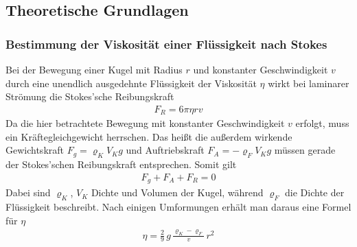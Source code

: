 \documentclass[12pt,a4paper,german]{scrartcl}
\numberwithin{equation}{section}
\begin{document}
  \subsection{Theoretische Grundlagen}
  \subsubsection{Bestimmung der Viskosität einer Flüssigkeit nach Stokes}
  Bei der Bewegung einer Kugel mit Radius $r$ und konstanter Geschwindigkeit $v$ durch eine unendlich ausgedehnte Flüssigkeit der Viskosität $\eta$ wirkt bei laminarer Strömung die Stokes'sche Reibungskraft
  \begin{align}
    F_R = 6 \pi \eta r v
    \label{eq_theo_stokes_friction}
  \end{align}
  Da die hier betrachtete Bewegung mit konstanter Geschwindigkeit $v$ erfolgt, muss ein Kräftegleichgewicht herrschen.
  Das heißt die außerdem wirkende Gewichtskraft $F_g = \varrho_K V_K g$ und Auftriebskraft $F_A = -\varrho_F V_K g$ müssen gerade der Stokes'schen Reibungskraft entsprechen. Somit gilt
  \begin{align}
    F_g + F_A + F_R = 0
    \label{eq_theo_stokes_force_equilibrium}
  \end{align}
  Dabei sind $\varrho_K$, $V_K$ Dichte und Volumen der Kugel, während $\varrho_F$ die Dichte der Flüssigkeit beschreibt.
  Nach einigen Umformungen erhält man daraus eine Formel für $\eta$
  \begin{align}
    \eta = \frac{2}{9} \, g \, \frac{\varrho_K - \varrho_F}{v} \, r^2
    \label{eq_theo_stokes_viscosity}
  \end{align}
\end{document}
